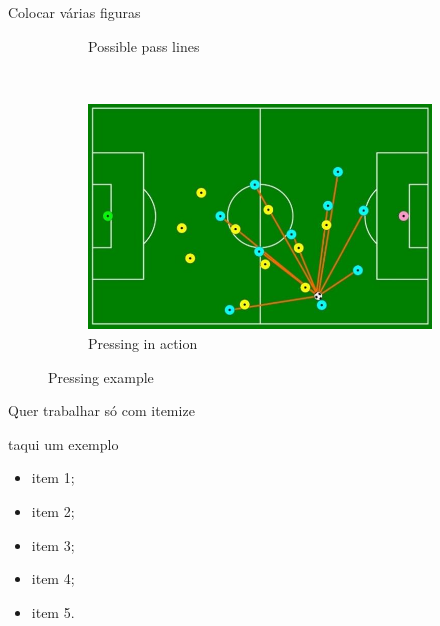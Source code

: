 \documentclass[xcolor=svgnames,8pt]{beamer}
\begin{document}
\begin{frame}{Colocar várias figuras}
\begin{figure}
\begin{subfigure}[t]{0.30\textwidth}
            \caption{Possible pass lines}
            \label{fig:pressing_b}
        \end{subfigure}
        ~
        \begin{subfigure}[t]{0.30\textwidth}
            \centering
            \includegraphics[width=1\linewidth]{figuras/pressing_1c}
            \caption{Pressing in action}
            \label{fig:pressing_c}
        \end{subfigure}%
        
        \caption{Pressing example}
        \label{fig:pressing}
        \end{figure}
    
    \end{frame}

    \begin{frame}{Quer trabalhar só com itemize}
    
        \begin{block}{taqui um exemplo}
            \begin{itemize}
            \item item 1;
            \item item 2;
            \item item 3;
            \item item 4;
            \item item 5.
        \end{itemize}
     \end{block}
    \end{frame}
\end{document}
